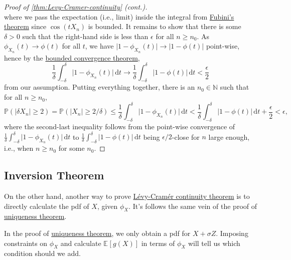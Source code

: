 \begin{proof}[Proof of \autoref{thm:Levy-Cramer-continuity} (cont.)]
\[	\]
	where we pass the expectation (i.e., limit) inside the integral from \href{https://en.wikipedia.org/wiki/Fubini's_theorem}{Fubini's theorem} since \(\cos (t X_n)\) is bounded. It remains to show that there is some \(\delta > 0\) such that the right-hand side is less than \(\epsilon \) for all \(n \geq n_0\). As \(\phi _{X_n}(t) \to \phi (t)\) for all \(t\), we have \(\vert 1 - \phi _{X_n}(t) \vert \to \vert 1 - \phi (t) \vert \) point-wise, hence by the \href{https://en.wikipedia.org/wiki/Dominated_convergence_theorem}{bounded convergence theorem},
	\[
		\frac{1}{\delta } \int_{-\delta }^{\delta } \vert 1 - \phi _{X_n}(t) \vert  \,\mathrm{d}t
		\to \frac{1}{\delta } \int_{-\delta }^{\delta } \vert 1 - \phi (t) \vert  \,\mathrm{d}t
		< \frac{\epsilon}{2}
	\]
	from our assumption. Putting everything together, there is an \(n_0 \in \mathbb{N} \) such that for all \(n \geq n_0\),
	\[
		\mathbb{P} (\vert \delta X_n \vert \geq 2)
		= \mathbb{P} (\vert X_n \vert \geq 2 / \delta )
		\leq \frac{1}{\delta } \int_{-\delta }^{\delta } \vert 1 - \phi _{X_n}(t) \vert  \,\mathrm{d}t
		< \frac{1}{\delta } \int_{-\delta }^{\delta } \vert 1 - \phi (t) \vert  \,\mathrm{d}t + \frac{\epsilon}{2}
		< \epsilon ,
	\]
	where the second-last inequality follows from the point-wise convergence of \(\frac{1}{\delta } \int_{-\delta }^{\delta } \vert 1 - \phi _{X_n}(t) \vert \,\mathrm{d}t\) to \(\frac{1}{\delta } \int_{-\delta }^{\delta } \vert 1 - \phi (t) \vert \,\mathrm{d}t\) being \(\epsilon / 2\)-close for \(n\) large enough, i.e., when \(n \geq n_0\) for some \(n_0\).
\end{proof}

\subsection{Inversion Theorem}
On the other hand, another way to prove \hyperref[thm:Levy-Cramer-continuity]{Lévy-Cramér continuity theorem} is to directly calculate the pdf of \(X\), given \(\phi _X\). It's follows the same vein of the proof of \hyperref[thm:characteristic-function-uniqueness]{uniqueness theorem}.

\begin{intuition}
	In the proof of \hyperref[thm:characteristic-function-uniqueness]{uniqueness theorem}, we only obtain a pdf for \(X + \sigma Z\). Imposing constraints on \(\phi _X\) and calculate \(\mathbb{E}_{}[g(X)] \) in terms of \(\phi _X\) will tell us which condition should we add.
\end{intuition}

